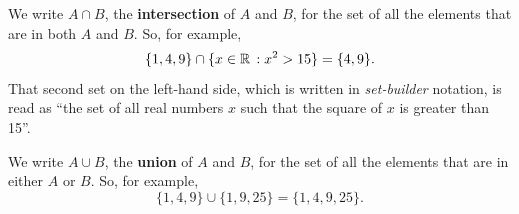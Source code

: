 \documentclass{watsonbook}
\begin{document}
\begin{tcolorbox}[title = Intersections and unions, parbox = false,
  colframe = MidnightBlue, colback=softblue] 
We write $A\cap B$, the \textbf{intersection} of $A$ and $B$, for the set of all the elements that are in both $A$ and $B$. So, for example, 
\[
\{1,4,9\} \cap \{ x \in \mathbb{R} \,: x^2 > 15 \} = \{4,9\}. 
\]
That second set on the left-hand side, which is written in \textit{set-builder} notation, is read as ``the set of all real numbers $x$ such that the square of $x$ is greater than 15''. 

We write $A\cup B$, the \textbf{union} of $A$ and $B$, for the set of all the elements that are in either $A$ or $B$. So, for example, 
\[
\{1,4,9\} \cup \{1,9,25\} = \{1,4,9,25\}. 
\]
\end{tcolorbox}
\end{document}
